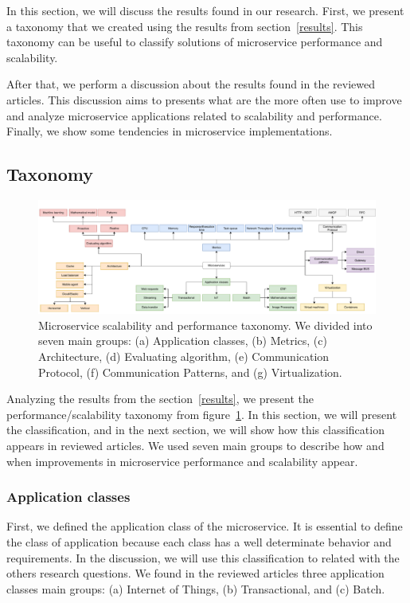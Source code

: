 In this section, we will discuss the results found in our research. First, we present a taxonomy that we created using the results from section~\ref{results}. This taxonomy can be useful to classify solutions of microservice performance and scalability.

After that, we perform a discussion about the results found in the reviewed articles. This discussion aims to presents what are the more often use to improve and analyze microservice applications related to scalability and performance. Finally, we show some tendencies in microservice implementations. 

\subsection{Taxonomy}
\begin{figure}[htb]
\centering
\includegraphics[scale=0.50]{Images/Taxonomy.pdf}
\caption{Microservice scalability and performance taxonomy. We divided into seven main groups: (a) Application classes, (b) Metrics, (c) Architecture, (d) Evaluating algorithm,  (e) Communication Protocol, (f) Communication Patterns, and (g) Virtualization.}
\label{taxonomy-figure}
\end{figure}

Analyzing the results from the section~\ref{results}, we present the performance/scalability taxonomy from figure~\ref{taxonomy-figure}. In this section, we will present the classification, and in the next section, we will show how this classification appears in reviewed articles. We used seven main groups to describe how and when improvements in microservice performance and scalability appear. 

\subsubsection{Application classes}
First, we defined the application class of the microservice. It is essential to define the class of application because each class has a well determinate behavior and requirements. In the discussion, we will use this classification to related with the others research questions. We found in the reviewed articles three application classes main groups: (a) Internet of Things, (b) Transactional, and (c) Batch.

